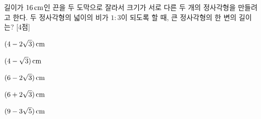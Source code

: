 길이가 $16\mkern3mu \mathrm{cm}$인 끈을 두 도막으로 잘라서 크기가 서로 다른 두 개의 정사각형을 만들려고 한다. 두 정사각형의 넓이의 비가 $1:3$이 되도록 할 때, 큰 정사각형의 한 변의 길이는? \mbox{[4점]}
\begin{choices32}{\rule[-3ex]{0pt}{8ex}$(4-2\sqrt{3})\mkern3mu \mathrm{cm}$}{\rule[-3ex]{0pt}{8ex}$(4-\sqrt{3})\mkern3mu \mathrm{cm}$}{\rule[-3ex]{0pt}{8ex}$(6-2\sqrt{3})\mkern3mu \mathrm{cm}$}{\rule[-3ex]{0pt}{8ex}$(6+2\sqrt{3})\mkern3mu \mathrm{cm}$}{\rule[-3ex]{0pt}{8ex}$(9-3\sqrt{5})\mkern3mu \mathrm{cm}$}\end{choices32}
